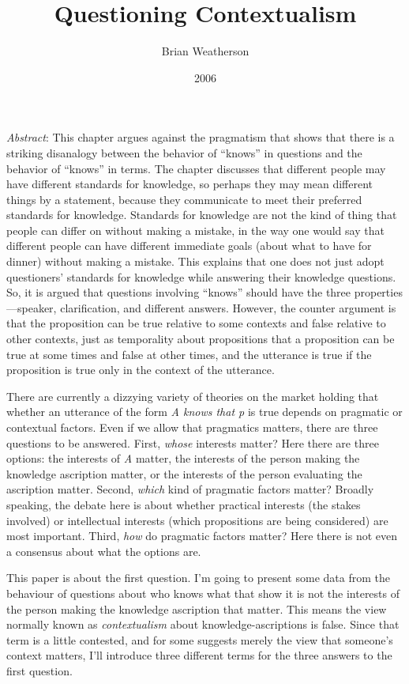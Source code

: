 \documentclass[
  11pt,
  letterpaper,
  DIV=11,
  numbers=noendperiod,
  twoside]{scrartcl}
\title{Questioning Contextualism}
\author{Brian Weatherson}
\date{2006}
\renewenvironment{abstract}
 {\vspace{-1.25cm}
 \quotation\small\noindent\emph{Abstract}:}
 {\endquotation}
\renewenvironment{abstract}
 {\quotation\small\noindent\emph{Abstract}:}
 {\endquotation\vspace{-0.02cm}}
\begin{document}
\maketitle
\begin{abstract}
This chapter argues against the pragmatism that shows that there is a
striking disanalogy between the behavior of ``knows'' in questions and
the behavior of ``knows'' in terms. The chapter discusses that different
people may have different standards for knowledge, so perhaps they may
mean different things by a statement, because they communicate to meet
their preferred standards for knowledge. Standards for knowledge are not
the kind of thing that people can differ on without making a mistake, in
the way one would say that different people can have different immediate
goals (about what to have for dinner) without making a mistake. This
explains that one does not just adopt questioners' standards for
knowledge while answering their knowledge questions. So, it is argued
that questions involving ``knows'' should have the three
properties---speaker, clarification, and different answers. However, the
counter argument is that the proposition can be true relative to some
contexts and false relative to other contexts, just as temporality about
propositions that a proposition can be true at some times and false at
other times, and the utterance is true if the proposition is true only
in the context of the utterance.
\end{abstract}


There are currently a dizzying variety of theories on the market holding
that whether an utterance of the form \emph{A knows that p} is true
depends on pragmatic or contextual factors. Even if we allow that
pragmatics matters, there are three questions to be answered. First,
\emph{whose} interests matter? Here there are three options: the
interests of \emph{A} matter, the interests of the person making the
knowledge ascription matter, or the interests of the person evaluating
the ascription matter. Second, \emph{which} kind of pragmatic factors
matter? Broadly speaking, the debate here is about whether practical
interests (the stakes involved) or intellectual interests (which
propositions are being considered) are most important. Third, \emph{how}
do pragmatic factors matter? Here there is not even a consensus about
what the options are.

This paper is about the first question. I'm going to present some data
from the behaviour of questions about who knows what that show it is not
the interests of the person making the knowledge ascription that matter.
This means the view normally known as \emph{contextualism} about
knowledge-ascriptions is false. Since that term is a little contested,
and for some suggests merely the view that someone's context matters,
I'll introduce three different terms for the three answers to the first
question.
\end{document}
